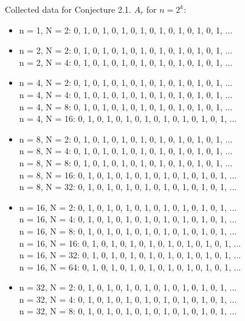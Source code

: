 \documentclass{article}
\begin{document}
\begin{flushleft}
    Collected data for Conjecture 2.1. $A_r$ for $n=2^k$:
    \begin{itemize}
        \item n = 1, N = 2:  0, 1, 0, 1, 0, 1, 0, 1, 0, 1, 0, 1, 0, 1, 0, 1, ...
        \item n = 2, N = 2:  0, 1, 0, 1, 0, 1, 0, 1, 0, 1, 0, 1, 0, 1, 0, 1, ...
            \\ n = 2, N = 4:  0, 1, 0, 1, 0, 1, 0, 1, 0, 1, 0, 1, 0, 1, 0, 1, ...
        \item n = 4, N = 2:  0, 1, 0, 1, 0, 1, 0, 1, 0, 1, 0, 1, 0, 1, 0, 1, ...
            \\ n = 4, N = 4:  0, 1, 0, 1, 0, 1, 0, 1, 0, 1, 0, 1, 0, 1, 0, 1, ...
            \\ n = 4, N = 8:  0, 1, 0, 1, 0, 1, 0, 1, 0, 1, 0, 1, 0, 1, 0, 1, ...
            \\ n = 4, N = 16:  0, 1, 0, 1, 0, 1, 0, 1, 0, 1, 0, 1, 0, 1, 0, 1, ...
        \item n = 8, N = 2:  0, 1, 0, 1, 0, 1, 0, 1, 0, 1, 0, 1, 0, 1, 0, 1, ...
            \\ n = 8, N = 4:  0, 1, 0, 1, 0, 1, 0, 1, 0, 1, 0, 1, 0, 1, 0, 1, ...
            \\ n = 8, N = 8:  0, 1, 0, 1, 0, 1, 0, 1, 0, 1, 0, 1, 0, 1, 0, 1, ...
            \\ n = 8, N = 16:  0, 1, 0, 1, 0, 1, 0, 1, 0, 1, 0, 1, 0, 1, 0, 1, ...
            \\ n = 8, N = 32:  0, 1, 0, 1, 0, 1, 0, 1, 0, 1, 0, 1, 0, 1, 0, 1, ...
        \item n = 16, N = 2:  0, 1, 0, 1, 0, 1, 0, 1, 0, 1, 0, 1, 0, 1, 0, 1, ...
            \\ n = 16, N = 4:  0, 1, 0, 1, 0, 1, 0, 1, 0, 1, 0, 1, 0, 1, 0, 1, ...
            \\ n = 16, N = 8:  0, 1, 0, 1, 0, 1, 0, 1, 0, 1, 0, 1, 0, 1, 0, 1, ...
            \\ n = 16, N = 16:  0, 1, 0, 1, 0, 1, 0, 1, 0, 1, 0, 1, 0, 1, 0, 1, ...
            \\ n = 16, N = 32:  0, 1, 0, 1, 0, 1, 0, 1, 0, 1, 0, 1, 0, 1, 0, 1, ...
            \\ n = 16, N = 64:  0, 1, 0, 1, 0, 1, 0, 1, 0, 1, 0, 1, 0, 1, 0, 1, ...
        \item n = 32, N = 2:  0, 1, 0, 1, 0, 1, 0, 1, 0, 1, 0, 1, 0, 1, 0, 1, ...
            \\ n = 32, N = 4:  0, 1, 0, 1, 0, 1, 0, 1, 0, 1, 0, 1, 0, 1, 0, 1, ...
            \\ n = 32, N = 8:  0, 1, 0, 1, 0, 1, 0, 1, 0, 1, 0, 1, 0, 1, 0, 1, ...

\end{itemize}
\end{flushleft}
\end{document}

